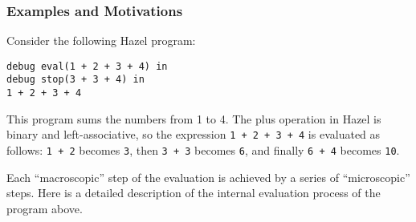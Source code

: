 
\subsubsection{Examples and Motivations}\label{sec:filter_example}

Consider the following Hazel program:
\lstset{xleftmargin=1in}
\begin{lstlisting}[language=hazel,caption={A simple Hazel program}]
debug eval(1 + 2 + 3 + 4) in
debug stop(3 + 3 + 4) in
1 + 2 + 3 + 4\end{lstlisting}

This program sums the numbers from 1 to 4. The plus operation in Hazel is binary
and left-associative, so the expression
\lstinline[language=hazel]{1 + 2 + 3 + 4} is evaluated as follows:
\lstinline[language=hazel]{1 + 2} becomes
\lstinline[language=hazel]{3}, then \lstinline[language=hazel]{3 + 3} becomes
\lstinline[language=hazel]{6}, and finally \lstinline[language=hazel]{6 + 4}
becomes \lstinline[language=hazel]{10}.

Each ``macroscopic'' step of the evaluation is achieved by a series of
``microscopic'' steps. Here is a detailed description of the internal evaluation
process of the program above.

